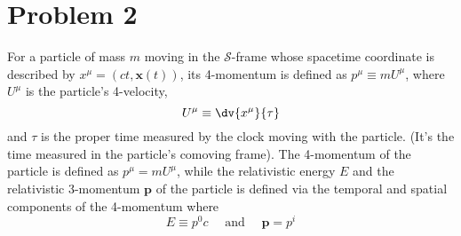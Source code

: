 \documentclass[10pt]{article}
\begin{document}
	\section*{Problem 2}
	For a particle of mass \( m \) moving in the \( \mathcal{S} \)-frame whose spacetime coordinate is
	described by \( x^{\mu} = (ct, \mathbf{x}(t)) \), its 4-momentum is defined as \( p^{\mu} \equiv m
	U^{\mu} \), where \( U^{\mu} \) is the particle's 4-velocity, 
	\[
		U^{\mu} \equiv \dv{x^{\mu}}{\tau}
	\]
	and \( \tau \) is the proper time measured by the clock moving with the particle. (It's the time measured
	in the particle's comoving frame). The 4-momentum of the particle is defined as \( p^{\mu} = m U^{\mu}
	\), while the relativistic energy \( E \) and the relativistic 3-momentum \( \mathbf{p} \) of the
	particle is defined via the temporal and spatial components of the 4-momentum where 
	\[
		E \equiv p^{0}c \quad \text{ and } \quad \mathbf{p} = p^{i}
	\]
\end{document}

